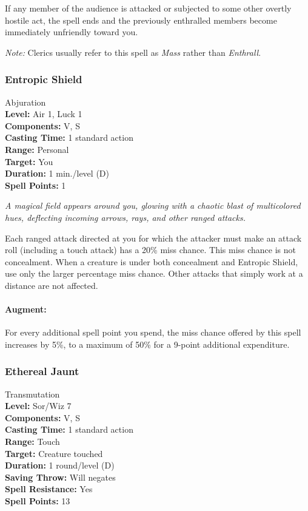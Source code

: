 If any member of the audience is attacked or subjected to some other overtly hostile act, the spell ends and the previously enthralled members become immediately unfriendly toward you.

\emph{Note:} Clerics usually refer to this spell as \emph{Mass} rather than \emph{Enthrall}.
\subsubsection{Entropic Shield}
\label{Spell:EntropicShield}
Abjuration
\\ \textbf{Level:} Air 1, Luck 1
\\ \textbf{Components:} V, S
\\ \textbf{Casting Time:} 1 standard action
\\ \textbf{Range:} Personal
\\ \textbf{Target:} You
\\ \textbf{Duration:} 1 min./level (D)
\\ \textbf{Spell Points:} 1

\emph{A magical field appears around you, glowing with a chaotic blast of multicolored hues, deflecting incoming arrows, rays, and other ranged attacks.} 
 
Each ranged attack directed at you for which the attacker must make an attack roll (including a touch attack) has a 20\% miss chance.
This miss chance is not concealment. When a creature is under both concealment and Entropic Shield, use only the larger percentage miss chance.
Other attacks that simply work at a distance are not affected.

\paragraph{Augment:} For every additional spell point you spend, the miss chance offered by this spell increases by 5\%, to a maximum of 50\% for a 9-point additional expenditure.
\subsubsection{Ethereal Jaunt}
\label{Spell:EtherealJaunt}
Transmutation
\\ \textbf{Level:} Sor/Wiz 7
\\ \textbf{Components:} V, S
\\ \textbf{Casting Time:} 1 standard action
\\ \textbf{Range:} Touch
\\ \textbf{Target:} Creature touched
\\ \textbf{Duration:} 1 round/level (D)
\\ \textbf{Saving Throw:} Will negates
\\ \textbf{Spell Resistance:} Yes
\\ \textbf{Spell Points:} 13

